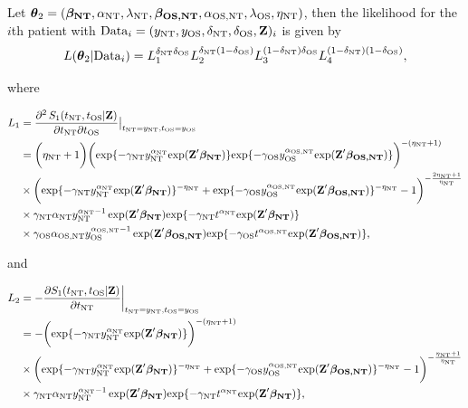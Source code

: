 Let
$\boldsymbol{\theta}_2=(\boldsymbol{\beta_{\rm NT}}, \alpha_{\rm NT}, \lambda_{\rm NT}, \boldsymbol{\beta_{\rm OS,NT}},
\alpha_{\rm OS,NT}, \lambda_{\rm OS}, \eta_{\rm NT})$,  then the
likelihood for the $i$th patient with ${\rm Data}_i=(y_{\rm NT}, y_{\rm OS},
\delta_{\rm NT}, \delta_{\rm OS}, \textbf{Z})_i$ is given by
$$
L(\boldsymbol{\theta}_2|{\rm Data}_i)
=L_1^{\delta_{\rm NT}\delta_{\rm OS}}
L_2^{\delta_{\rm NT}(1-\delta_{\rm OS})}L_3^{(1-\delta_{\rm NT})\delta_{\rm OS}}
L_4^{(1-\delta_{\rm NT})(1-\delta_{\rm OS})}, 
$$

where

\begin{align*}
L_1 &=\frac{\partial^2\, S_1(t_{\rm NT}, t_{\rm OS}|\textbf{Z})}{\partial t_{\rm NT} \partial t_{\rm OS}}\big|_{t_{\rm NT}=y_{\rm NT},t_{\rm OS}=y_{\rm OS}}
\\
& =\bigg(\eta_{\rm NT}+1\bigg)\bigg(\mathrm{exp}\{-\gamma_{\rm NT} y_{\rm NT}^{\alpha_{\rm NT}}
\mathrm{exp}(\textbf{Z}' \boldsymbol{\beta_{\rm NT}} )\} \mathrm{exp}\{-\gamma_{\rm OS} y_{\rm OS}^{\alpha_{\rm OS,NT}}
\mathrm{exp}(\textbf{Z}' \boldsymbol{\beta_{\rm OS,NT}} )\}\bigg)^{-(\eta_{\rm NT}+1)} \\
& \times \bigg(\mathrm{exp}\{-\gamma_{\rm NT} y_{\rm NT}^{\alpha_{\rm NT}}
\mathrm{exp}(\textbf{Z}' \boldsymbol{\beta_{\rm NT}} )\}^{-\eta_{\rm NT}}+\mathrm{exp}\{-\gamma_{\rm OS} y_{\rm OS}^{\alpha_{\rm OS,NT}}
\mathrm{exp}(\textbf{Z}' \boldsymbol{\beta_{\rm OS,NT}} )\}^{-\eta_{\rm NT}}-1\bigg)^{-\frac{2\eta_{\rm NT}+1}{\eta_{\rm NT}}} \\
&\times \gamma_{\rm NT} \alpha_{\rm NT} y_{\rm NT}^{{\alpha_{\rm NT} -1}} \exp(\textbf{Z}' \boldsymbol{\beta_{\rm NT}}) \mathrm{exp}\{-\gamma_{\rm NT} t^{\alpha_{\rm NT}}
\mathrm{exp}(\textbf{Z}' \boldsymbol{\beta_{\rm NT}} )\}\\
&\times \gamma_{\rm OS} \alpha_{\rm OS,NT} y_{\rm OS}^{{\alpha_{\rm OS,NT} -1}} \exp(\textbf{Z}' \boldsymbol{\beta_{\rm OS,NT}}) \mathrm{exp}\{-\gamma_{\rm OS} t^{\alpha_{\rm OS,NT}}
\mathrm{exp}(\textbf{Z}' \boldsymbol{\beta_{\rm OS,NT}} )\},
\end{align*}

and


\begin{align*}
L_2&=-\frac{\partial S_1(t_{\rm NT}, t_{\rm OS}|\textbf{Z})}{\partial t_{\rm NT}}\bigg|_{t_{\rm NT}=y_{\rm NT},t_{\rm OS}=y_{\rm OS}} \\
&=-\bigg(\mathrm{exp}\{-\gamma_{\rm NT} y_{\rm NT}^{\alpha_{\rm NT}}
\mathrm{exp}(\textbf{Z}' \boldsymbol{\beta_{\rm NT}} )\}\bigg)^{-(\eta_{\rm NT}+1)}\\
&\times \bigg(\mathrm{exp}\{-\gamma_{\rm NT} y_{\rm NT}^{\alpha_{\rm NT}}
\mathrm{exp}(\textbf{Z}' \boldsymbol{\beta_{\rm NT}} )\}^{-\eta_{\rm NT}}+\mathrm{exp}\{-\gamma_{\rm OS} y_{\rm OS}^{\alpha_{\rm OS,NT}}
\mathrm{exp}(\textbf{Z}' \boldsymbol{\beta_{\rm OS,NT}} )\}^{-\eta_{\rm NT}}-1\bigg)^{-\frac{\eta_{\rm NT}+1}{\eta_{\rm NT}}}\\
&\times \gamma_{\rm NT} \alpha_{\rm NT} y_{\rm NT}^{{\alpha_{\rm NT} -1}} \exp(\textbf{Z}' \boldsymbol{\beta_{\rm NT}}) \mathrm{exp}\{-\gamma_{\rm NT} t^{\alpha_{\rm NT}}
\mathrm{exp}(\textbf{Z}' \boldsymbol{\beta_{\rm NT}} )\},
\end{align*}


